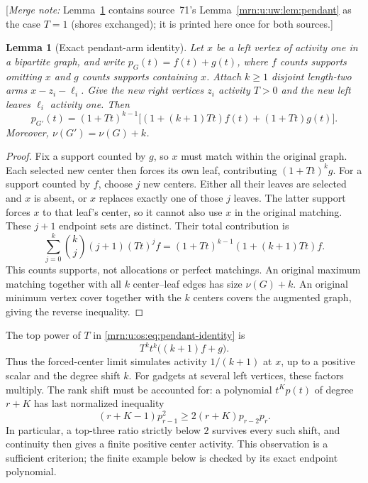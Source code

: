 \documentclass[11pt,a4paper]{article}
\newtheorem{lemma}[theorem]{Lemma}
\theoremstyle{remark}\newtheorem{remark}[theorem]{Remark}
\newcommand{\mnote}[1]{[\textit{Merge note:} #1]}
\begin{document}
\mnote{Lemma~\ref{mrn:u:os:lem:pendant-identity} contains source~71's Lemma~\ref{mrn:u:uw:lem:pendant} as the case $T=1$ (shores exchanged); it is printed here once for both sources.}
\begin{lemma}[Exact pendant-arm identity]\label{mrn:u:os:lem:pendant-identity}
Let $x$ be a left vertex of activity one in a bipartite graph, and write
$p_G(t)=f(t)+g(t)$, where $f$ counts supports omitting $x$ and $g$ counts
supports containing $x$. Attach $k\ge1$ disjoint length-two arms
$x-z_i-\ell_i$. Give the new right vertices $z_i$ activity $T>0$ and the
new left leaves $\ell_i$ activity one. Then
\begin{equation}\label{mrn:u:os:eq:pendant-identity}
 p_{G'}(t)=(1+Tt)^{k-1}
 \bigl[(1+(k+1)Tt)f(t)+(1+Tt)g(t)\bigr].
\end{equation}
Moreover, $\nu(G')=\nu(G)+k$.
\end{lemma}
\begin{proof}
Fix a support counted by $g$, so $x$ must match within the original graph.
Each selected new center then forces its own leaf, contributing
$(1+Tt)^k g$.
For a support counted by $f$, choose $j$ new centers. Either all their
leaves are selected and $x$ is absent, or $x$ replaces exactly one of those
$j$ leaves. The latter support forces $x$ to that leaf's center, so it
cannot also use $x$ in the original matching. These $j+1$ endpoint sets
are distinct. Their total contribution is
\[
 \sum_{j=0}^k\binom kj(j+1)(Tt)^j f
 =(1+Tt)^{k-1}(1+(k+1)Tt)f.
\]
This counts supports, not allocations or perfect matchings.
An original maximum matching together with all $k$ center--leaf edges
has size $\nu(G)+k$. An original minimum vertex cover together with the
$k$ centers covers the augmented graph, giving the reverse inequality.
\end{proof}

The top power of $T$ in \eqref{mrn:u:os:eq:pendant-identity} is
\[
 T^kt^k\bigl((k+1)f+g\bigr).
\]
Thus the forced-center limit simulates activity $1/(k+1)$ at $x$, up to
a positive scalar and the degree shift $k$. For gadgets at several left
vertices, these factors multiply. The rank shift must be accounted for:
a polynomial $t^Kp(t)$ of degree $r+K$ has last normalized inequality
\[
 (r+K-1)p_{r-1}^2\ge2(r+K)p_{r-2}p_r.
\]
In particular, a top-three ratio strictly below $2$ survives every such
shift, and continuity then gives a finite positive center activity.
This observation is a sufficient criterion; the finite example below is
checked by its exact endpoint polynomial.
\end{document}
